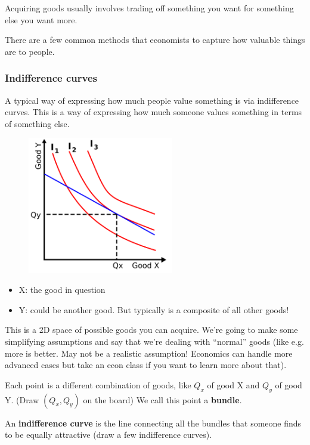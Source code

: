 \documentclass[11pt]{article}
\begin{document}
Acquiring goods usually involves trading off something you want for something else you want more. 

There are a few common methods that economists to capture how valuable things are to people.

\subsubsection{Indifference curves}

A typical way of expressing how much people value something is via indifference curves. This is a way of expressing how much someone values something in terms of something else. 

\begin{figure}[h]
    \centering
    \includegraphics*[width=2.5in]{indifference.png}
\end{figure}
 

\begin{itemize}
    \item X: the good in question
    \item Y: could be another good. But typically is a composite of all other goods!
\end{itemize}

This is a 2D space of possible goods you can acquire. We're going to make some simplifying assumptions and say that we're dealing with ``normal'' goods (like e.g. more is better. May not be a realistic assumption! Economics can handle more advanced cases but take an econ class if you want to learn more about that).

Each point is a different combination of goods, like $Q_x$ of good X and $Q_y$ of good Y. (Draw $(Q_x, Q_y)$ on the board) We call this point a {\bf bundle}.

An {\bf indifference curve} is the line connecting all the bundles that someone finds to be equally attractive (draw a few indifference curves).
\end{document}

